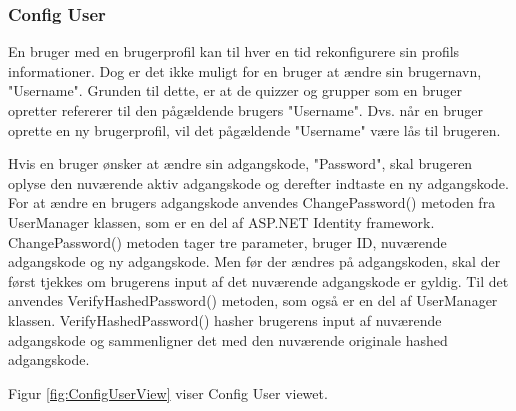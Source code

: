 \subsubsection{Config User}

En bruger med en brugerprofil kan til hver en tid rekonfigurere sin profils informationer. Dog er det ikke muligt for en bruger at ændre sin brugernavn, "Username". Grunden til dette, er at de quizzer og grupper som en bruger opretter refererer til den pågældende brugers "Username". Dvs. når en bruger oprette en ny brugerprofil, vil det pågældende "Username" være lås til brugeren. 

Hvis en bruger ønsker at ændre sin adgangskode, "Password", skal brugeren oplyse den nuværende aktiv adgangskode og derefter indtaste en ny adgangskode. For at ændre en brugers adgangskode anvendes ChangePassword() metoden fra UserManager klassen, som er en del af ASP.NET Identity framework. ChangePassword() metoden tager tre parameter, bruger ID, nuværende adgangskode og ny adgangskode. Men før der ændres på adgangskoden, skal der først tjekkes om brugerens input af det nuværende adgangskode er gyldig. Til det anvendes VerifyHashedPassword() metoden, som også er en del af UserManager klassen. VerifyHashedPassword() hasher brugerens input af nuværende adgangskode og sammenligner det med den nuværende originale hashed adgangskode. 

Figur \ref{fig:ConfigUserView} viser Config User viewet. 

